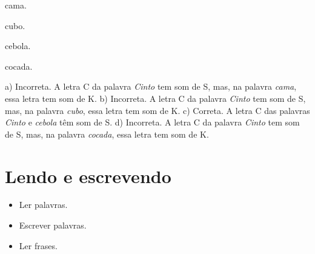 \begin{minipage}{.5\textwidth}
\begin{escolha}
\item cama.

\item cubo.

\item cebola.

\item cocada.
\end{escolha}
\end{minipage}

a) Incorreta. A letra C da palavra \textit{Cinto} tem som de S, mas,
na palavra \textit{cama}, essa letra tem som de K. 
b) Incorreta. A letra C da palavra \textit{Cinto} tem som de S, mas,
na palavra \textit{cubo}, essa letra tem som de K.
c) Correta. A letra C das palavras \textit{Cinto} e \textit{cebola}
têm som de S.
d) Incorreta. A letra C da palavra \textit{Cinto} tem som de S, mas,
na palavra \textit{cocada}, essa letra tem som de K.

\chapter{Lendo e escrevendo}



\begin{itemize}
\item Ler palavras.
\item Escrever palavras.
\item Ler frases.
\end{itemize}

